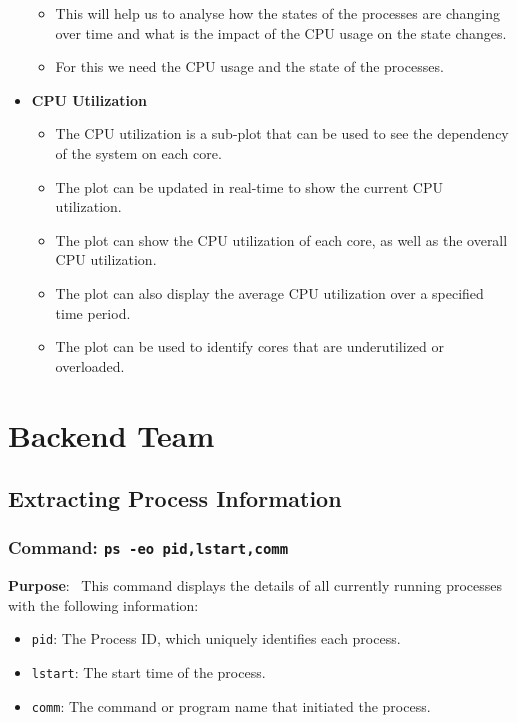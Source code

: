 \documentclass[12pt]{article}
\begin{document}
\begin{itemize}
\begin{itemize}
        \item This will help us to analyse how the states of the processes are changing over time and what is the impact of the CPU usage on the state changes.
        \item For this we need the CPU usage and the state of the processes.
    \end{itemize}
    \item {\bf CPU Utilization}
    \begin{itemize}
        \item The CPU utilization is a sub-plot that can be used to see the dependency of the system on each core.
        \item The plot can be updated in real-time to show the current CPU utilization.
        \item The plot can show the CPU utilization of each core, as well as the overall CPU utilization.
        \item The plot can also display the average CPU utilization over a specified time period.
        \item The plot can be used to identify cores that are underutilized or overloaded.
    \end{itemize}
\end{itemize}

\section{Backend Team}
\subsection{Extracting Process Information}
\subsubsection{Command: \texttt{ps -eo pid,lstart,comm}}

\textbf{Purpose}: \
This command displays the details of all currently running processes with the following information:

\begin{itemize}
    \item \texttt{pid}: The Process ID, which uniquely identifies each process.
    \item \texttt{lstart}: The start time of the process.
    \item \texttt{comm}: The command or program name that initiated the process.
\end{itemize}
\end{document}
